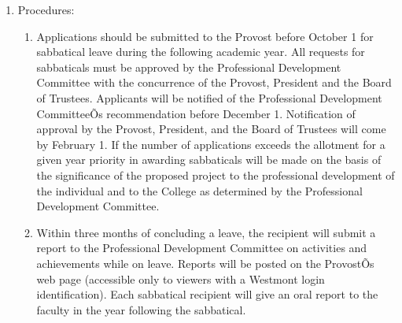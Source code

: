 \documentclass[letterpaper, 11pt]{article}
\begin{document}
\begin{enumerate}[label=\alph*)]
{\begin{enumerate}[label=\arabic*)]
							\item{Procedures:
								\begin{enumerate}[label=\arabic*)]
									\item{Applications should be submitted to the Provost before October 1 for sabbatical leave during the following academic year.  All requests for sabbaticals must be approved by the Professional Development Committee with the concurrence of the Provost, President and the Board of Trustees.  Applicants will be notified of the Professional Development CommitteeÕs recommendation before December 1.  Notification of approval by the Provost, President, and the Board of Trustees will come by February 1. If the number of applications exceeds the allotment for a given year priority in awarding sabbaticals will be made on the basis of the significance of the proposed project to the professional development of the individual and to the College as determined by the Professional Development Committee.}
									\item{Within three months of concluding a leave, the recipient will submit a report to the Professional Development Committee on activities and achievements while on leave.  Reports will be posted on the ProvostÕs web page (accessible only to viewers with a Westmont login identification).  Each sabbatical recipient will give an oral report to the faculty in the year following the sabbatical.}
								\end{enumerate}
							}
						\end{enumerate}
					}
				\end{enumerate}
\end{document}
